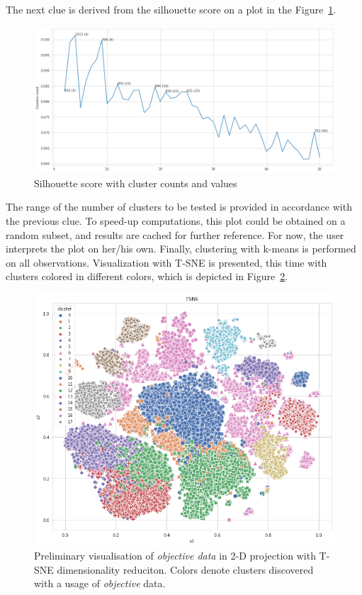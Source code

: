 \documentclass[
 twocolumn,
 hf,
]{ceurart}
\begin{document}
The next clue is derived from the silhouette score on a plot in the Figure~\ref{fig:silhouette}.
\begin{figure}[h!]
  \centering
  \includegraphics[width=\linewidth]{silhouette-50}
  \caption{Silhouette score with cluster counts and values}
  \label{fig:silhouette}
\end{figure}
The range of the number of clusters to be tested is provided in accordance with the previous clue.
To speed-up computations, this plot could be obtained on a random subset, and results are cached for further reference.
For now, the user interprets the plot on her/his own.
Finally, clustering with k-means is performed on all observations.
Visualization with T-SNE is presented, this time with clusters colored in different colors, which is depicted in Figure~\ref{fig:kmeans}.
\begin{figure}[h!]
  \centering
  \includegraphics[width=\linewidth]{example1-clustering-products-fashion-tex/output_59_0}
  \caption{Preliminary visualisation of \textit{objective data} in 2-D projection with T-SNE dimensionality reduciton. Colors denote clusters discovered with a usage of \textit{objective} data.}
  \label{fig:kmeans}
\end{figure}
\end{document}

